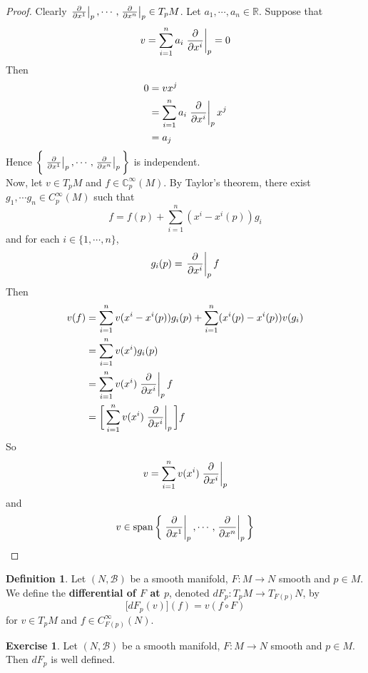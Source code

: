 \documentclass[12pt]{amsart}
\theoremstyle{definition}
\newtheorem{defn}[definition]{Definition}
\newtheorem{ex}[definition]{Exercise}
\newcommand{\C}{\mathbb{C}}
\newcommand{\R}{\mathbb{R}}
\newcommand{\MB}{\mathcal{B}}
\DeclareMathOperator{\spn}{span}
\begin{document}
	\begin{proof}
		Clearly $\eval{\pdv{x^1}}_{p}, \cdots, \eval{\pdv{x^n}}_{p} \in T_pM$. Let $a_1, \cdots, a_n \in \R$. Suppose that $$v = \sum_{i=1}^n a_i \eval{\pdv{x^i}}_{p} = 0$$
		Then 
		\begin{align*}
			0
			&= v x^j \\
			&= \sum_{i=1}^n a_i \eval{\pdv{x^i}}_{p} x^j \\
			&= a_j
		\end{align*}
		Hence $\bigg \{\eval{\pdv{x^1}}_{p}, \cdots, \eval{\pdv{x^n}}_{p} \bigg \}$ is independent.\\
		Now, let $v \in T_pM$ and $f \in \C^{\infty}_p(M)$. By Taylor's theorem, there exist $g_1, \cdots g_n \in C_p^{\infty}(M)$ such that $$f = f(p) + \sum_{i=1}^n(x^i - x^i(p)) g_i$$ and for each $i \in \{1, \cdots, n\}$, $$g_i(p) = \eval{\pdv{x^i}}_{p} f $$ Then 
		\begin{align*}
			v(f)
			&= \sum_{i=1}^nv(x^i - x^i(p)) g_i(p) + \sum_{i=1}^n(x^i(p) - x^i(p)) v(g_i) \\
			&= \sum_{i=1}^nv(x^i)g_i(p) \\
			&= \sum_{i=1}^nv(x^i)\eval{\pdv{x^i}}_{p} f \\
			&= \bigg[ \sum_{i=1}^nv(x^i)\eval{\pdv{x^i}}_{p} \bigg] f
		\end{align*}
		So $$v = \sum_{i=1}^nv(x^i)\eval{\pdv{x^i}}_{p} $$ and $$v \in \spn \bigg \{\eval{\pdv{x^1}}_{p}, \cdots, \eval{\pdv{x^n}}_{p} \bigg \}$$
	\end{proof}



	\begin{defn}
		Let $(N, \MB)$ be a smooth manifold, $F: M \rightarrow N$ smooth and $p \in M$. We define the \textbf{differential of $F$ at $p$}, denoted $dF_p: T_pM \rightarrow T_{F(p)}N$, by $$\bigg[ dF_p(v) \bigg] (f) = v (f \circ F)$$  for $v \in T_pM$ and $f \in C^{\infty}_{F(p)}(N)$.
	\end{defn}
	
	
	
	\begin{ex}
	Let $(N, \MB)$ be a smooth manifold, $F: M \rightarrow N$ smooth and $p \in M$. Then $dF_p$ is well defined.
	\end{ex}
	
\end{document}
